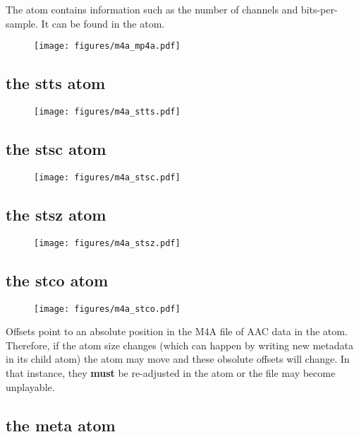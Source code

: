 The  atom contains information such as the number of channels
and bits-per-sample.  It can be found in the  atom.

\begin{figure}[h]
\texttt{[image: figures/m4a\_mp4a.pdf]}
\end{figure}

\pagebreak

\subsection{the stts atom}

\begin{figure}[h]
\texttt{[image: figures/m4a\_stts.pdf]}
\end{figure}

\subsection{the stsc atom}

\begin{figure}[h]
\texttt{[image: figures/m4a\_stsc.pdf]}
\end{figure}

\subsection{the stsz atom}

\begin{figure}[h]
\texttt{[image: figures/m4a\_stsz.pdf]}
\end{figure}

\pagebreak

\subsection{the stco atom}

\begin{figure}[h]
\texttt{[image: figures/m4a\_stco.pdf]}
\end{figure}
\par
\noindent
Offsets point to an absolute position in the M4A file of AAC data in
the  atom.  Therefore, if the  atom size changes
(which can happen by writing new metadata in its  child atom)
the  atom may move and these obsolute offsets will change.
In that instance, they \textbf{must}
be re-adjusted in the  atom or the file may become unplayable.

\subsection{the meta atom}

